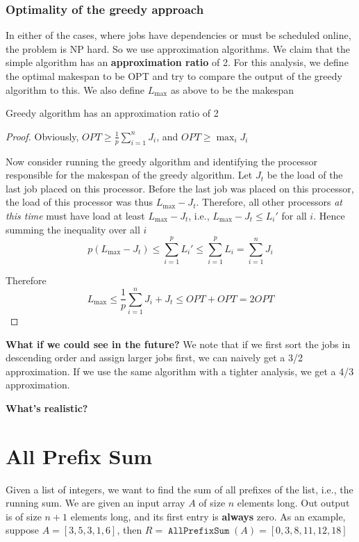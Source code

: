 \documentclass[11pt]{article}
\DeclareMathOperator{\AllPrefixSum}{\texttt{AllPrefixSum}}
\begin{document}
\subsubsection{Optimality of the greedy approach}
\label{sec:org3fee125}
In either of the cases, where jobs have dependencies or must be scheduled online, the problem is
NP hard. So we use approximation algorithms. We claim that the simple algorithm has an
\textbf{approximation ratio} of 2. For this analysis, we define the optimal makespan to be OPT and try to
compare the output of the greedy algorithm to this. We also define \(L_{\max}\) as above to be
the makespan

\begin{claim}
Greedy algorithm has an approximation ratio of 2
\end{claim}

\begin{proof}
Obviously, \(OPT\ge\frac{1}{p}\sum_{i=1}^nJ_i\), and \(OPT\ge\max_iJ_i\)

Now consider running the greedy algorithm and identifying the processor responsible for the
makespan of the greedy algorithm. Let \(J_t\) be the load of the last job placed on this
processor. Before the last job was placed on this processor, the load of this processor was
thus \(L_{\max}-J_t\). Therefore, all other processors \emph{at this time} must have load at
least \(L_{\max}-J_t\), i.e., \(L_{\max}-J_t\le L_i'\) for all \(i\). Hence summing the inequality
over all \(i\)
\begin{equation*}
p(L_{\max}-J_t)\le\sum_{i=1}^pL_i'\le\sum_{i=1}^pL_i=\sum_{i=1}^nJ_i
\end{equation*}

Therefore
\begin{equation*}
L_{\max}\le\frac{1}{p}\sum_{i=1}^nJ_i+J_t\le OPT+OPT=2OPT
\end{equation*}
\end{proof}

\textbf{What if we could see in the future?} We note that if we first sort the jobs in descending order
and assign larger jobs first, we can naively get a 3/2 approximation. If we use the same
algorithm with a tighter analysis, we get a 4/3 approximation.

\textbf{What's realistic?}
\section{All Prefix Sum}
\label{sec:org1df53dc}
Given a list of integers, we want to find the sum of all prefixes of the list, i.e., the
running sum. We are given an input array \(A\) of size \(n\) elements long. Out output is of
size \(n+1\) elements long, and its first entry is \textbf{always} zero. As an example,
suppose \(A=[3,5,3,1,6]\), then \(R=\AllPrefixSum(A)=[0,3,8,11,12,18]\)
\end{document}
